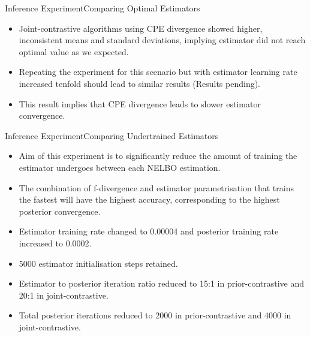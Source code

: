 \documentclass{beamer}
\begin{document}
\begin{frame}{Inference Experiment}{Comparing Optimal Estimators}
\begin{itemize}
\item Joint-contrastive algorithms using CPE divergence showed higher, inconsistent means and standard deviations, implying estimator did not reach optimal value as we expected.
\item Repeating the experiment for this scenario but with estimator learning rate increased tenfold should lead to similar results (Results pending).
\item This result implies that CPE divergence leads to slower estimator convergence.
\end{itemize}
\end{frame}
\begin{frame}{Inference Experiment}{Comparing Undertrained Estimators}
\begin{itemize}
\item Aim of this experiment is to significantly reduce the amount of training the estimator undergoes between each NELBO estimation.
\item The combination of f-divergence and estimator parametrisation that trains the fastest will have the highest accuracy, corresponding to the highest posterior convergence.
\item Estimator training rate changed to 0.00004 and posterior training rate increased to 0.0002.
\item 5000 estimator initialisation steps retained.
\item Estimator to posterior iteration ratio reduced to 15:1 in prior-contrastive and 20:1 in joint-contrastive.
\item Total posterior iterations reduced to 2000 in prior-contrastive and 4000 in joint-contrastive.
\end{itemize}
\end{frame}
\end{document}
